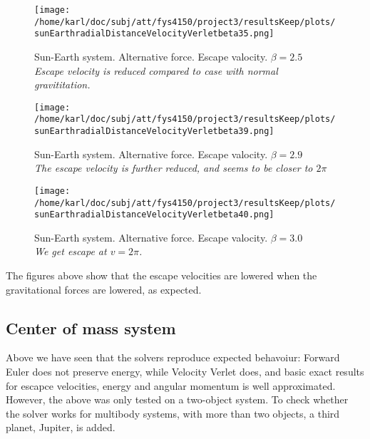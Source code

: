 \documentclass{article}
\begin{document}
\begin{minipage}{.3\textwidth} 
	\begin{figure}[H]
		\centering
		\texttt{[image: /home/karl/doc/subj/att/fys4150/project3/resultsKeep/plots/sunEarthradialDistanceVelocityVerletbeta35.png]}
		\caption{Sun-Earth system. Alternative force. Escape valocity. $\beta = 2.5$ \\ \textit{Escape velocity is reduced compared to case with normal gravititation.}}
		\label{1}
	\end{figure}
\end{minipage}\hfill
\begin{minipage}{.3\textwidth} 
	\begin{figure}[H]
		\centering
		\texttt{[image: /home/karl/doc/subj/att/fys4150/project3/resultsKeep/plots/sunEarthradialDistanceVelocityVerletbeta39.png]}
		\caption{Sun-Earth system. Alternative force. Escape valocity. $\beta = 2.9$ \\ \textit{The escape velocity is further reduced, and seems to be closer to $2  \pi$}}
		\label{1}
	\end{figure}
\end{minipage}\hfill
\begin{minipage}{.3\textwidth} 
	\begin{figure}[H]
		\centering
		\texttt{[image: /home/karl/doc/subj/att/fys4150/project3/resultsKeep/plots/sunEarthradialDistanceVelocityVerletbeta40.png]}
		\caption{Sun-Earth system. Alternative force. Escape valocity. $\beta = 3.0$ \\ \textit{We get escape at $v = 2\pi$.}}
		\label{1}
	\end{figure}
\end{minipage}\hfill
\vspace{2ex}

The figures above show that the escape velocities are lowered when the gravitational forces are lowered, as expected.  

\subsection{Center of mass system}
Above we have seen that the solvers reproduce expected behavoiur: Forward Euler does not preserve energy, while Velocity Verlet does, and basic exact results for escapce velocities, energy and angular momentum is well approximated. However, the above was only tested on a two-object system. To check whether the solver works for multibody systems, with more than two objects, a third planet, Jupiter, is added.\\
\end{document}
